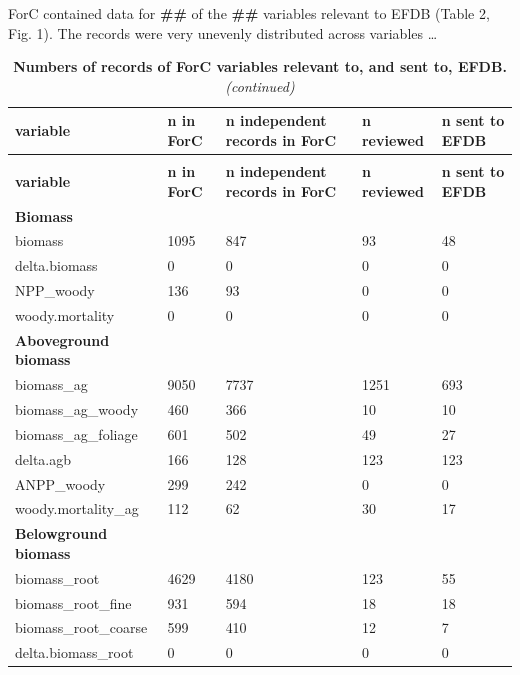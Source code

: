 \documentclass[, manuscript]{copernicus}
\begin{document}
ForC contained data for \textbf{\#\#} of the \textbf{\#\#} variables
relevant to EFDB (Table 2, Fig. 1). The records were very unevenly
distributed across variables \ldots{}

\newpage
\begingroup\fontsize{8}{10}\selectfont

\begin{longtable}[t]{l|l|l|l|l}
\caption{\label{tab:table_variables}\textbf{Numbers of records of ForC variables relevant to, and sent to, EFDB.}}\\
\hline
\textbf{variable} & \textbf{n in ForC} & \textbf{n independent records in ForC} & \textbf{n reviewed} & \textbf{n sent to EFDB}\\
\hline
\endfirsthead
\caption[]{\textbf{Numbers of records of ForC variables relevant to, and sent to, EFDB.} \textit{(continued)}}\\
\hline
\textbf{variable} & \textbf{n in ForC} & \textbf{n independent records in ForC} & \textbf{n reviewed} & \textbf{n sent to EFDB}\\
\hline
\endhead
\textbf{Biomass} & \textbf{} & \textbf{} & \textbf{} & \textbf{}\\
\hline
biomass & 1095 & 847 & 93 & 48\\
\hline
delta.biomass & 0 & 0 & 0 & 0\\
\hline
NPP\_woody & 136 & 93 & 0 & 0\\
\hline
woody.mortality & 0 & 0 & 0 & 0\\
\hline
\textbf{Aboveground biomass} & \textbf{} & \textbf{} & \textbf{} & \textbf{}\\
\hline
biomass\_ag & 9050 & 7737 & 1251 & 693\\
\hline
biomass\_ag\_woody & 460 & 366 & 10 & 10\\
\hline
biomass\_ag\_foliage & 601 & 502 & 49 & 27\\
\hline
delta.agb & 166 & 128 & 123 & 123\\
\hline
ANPP\_woody & 299 & 242 & 0 & 0\\
\hline
woody.mortality\_ag & 112 & 62 & 30 & 17\\
\hline
\textbf{Belowground biomass} & \textbf{} & \textbf{} & \textbf{} & \textbf{}\\
\hline
biomass\_root & 4629 & 4180 & 123 & 55\\
\hline
biomass\_root\_fine & 931 & 594 & 18 & 18\\
\hline
biomass\_root\_coarse & 599 & 410 & 12 & 7\\
\hline
delta.biomass\_root & 0 & 0 & 0 & 0\\

\end{longtable}
\end{document}
